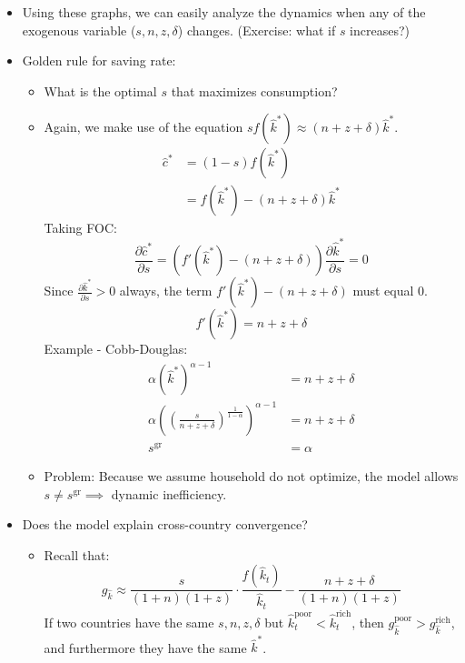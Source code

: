 \documentclass[notitlepage]{article}
\begin{document}
\newpage
\begin{itemize}
\item Using these graphs, we can easily analyze the dynamics when any of the exogenous variable ($s, n, z, \delta$) changes. (Exercise: what if $s$ increases?)
\item Golden rule for saving rate:
\begin{itemize}
\item What is the optimal $s$ that maximizes consumption?
\item Again, we make use of the equation $sf(\hat{k}^*) \approx (n+z+\delta)\hat{k}^*$.
\begin{align*}
\hat{c}^* &= (1-s)f(\hat{k}^*) \\
&= f(\hat{k}^*) - (n+z+\delta)\hat{k}^*
\end{align*}
Taking FOC:
\[
\frac{\partial \hat{c}^*}{\partial s} = (f'(\hat{k}^*) - (n+z+\delta)) \frac{\partial \hat{k}^*}{\partial s} = 0
\]
Since $\frac{\partial \hat{k}^*}{\partial s} > 0$ always, the term $f'(\hat{k}^*) - (n+z+\delta)$ must equal 0.
\[
f'(\hat{k}^*) = n+z+\delta
\]
Example - Cobb-Douglas:
\begin{align*}
\alpha (\hat{k}^*)^{\alpha-1} &= n+z+\delta \\
\alpha \left(\left(\frac{s}{n+z+\delta}\right)^{\frac{1}{1-\alpha}}\right)^{\alpha-1} &= n+z+\delta \\
s^{\text{gr}} &= \alpha
\end{align*}
\item Problem: Because we assume household do not optimize, the model allows $s \ne s^{\text{gr}} \implies$ dynamic inefficiency.
\end{itemize}

\item Does the model explain cross-country convergence?
\begin{itemize}
\item Recall that:
\[
g_{\hat{k}} \approx \frac{s}{(1+n)(1+z)}\cdot\frac{f(\hat{k}_t)}{\hat{k}_t} - \frac{n+z+\delta}{(1+n)(1+z)}
\]
If two countries have the same $s, n, z, \delta$ but $\hat{k}_t^\text{poor} < \hat{k}_t^\text{rich}$, then $g_{\hat{k}}^\text{poor} > g_{\hat{k}}^\text{rich}$, and furthermore they have the same $\hat{k}^*$.
\end{itemize}
\end{itemize}
\begin{figure}[h]
    \centering
    \resizebox{0.6\textwidth}{!}{
    
    }
\end{figure}
\end{document}
